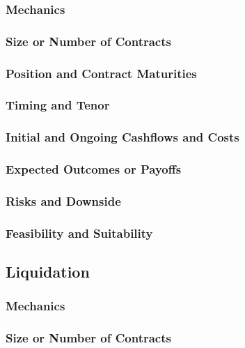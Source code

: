 \documentclass[11pt, a4paper, british]{article}
\begin{document}
\subsubsection{Mechanics}

\subsubsection{Size or Number of Contracts}

\subsubsection{Position and Contract Maturities}

\subsubsection{Timing and Tenor}

\subsubsection{Initial and Ongoing Cashflows and Costs}

\subsubsection{Expected Outcomes or Payoffs}

\subsubsection{Risks and Downside}

\subsubsection{Feasibility and Suitability}

\newpage

\subsection{Liquidation}

\subsubsection{Mechanics}

\subsubsection{Size or Number of Contracts}
\end{document}
